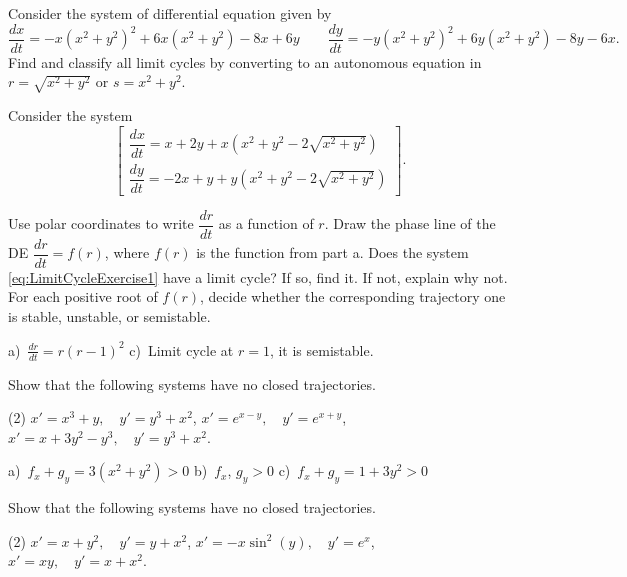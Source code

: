 \begin{exercise}\ansMark%
Consider the system of differential equation given by
\[ \frac{dx}{dt} = -x(x^2 + y^2)^2 + 6x(x^2 + y^2) - 8x + 6y \qquad \frac{dy}{dt} = -y(x^2 + y^2)^2 + 6y(x^2 + y^2) - 8y - 6x .\]
Find and classify all limit cycles by converting to an autonomous equation in $r = \sqrt{x^2 + y^2}$ or $s = x^2 + y^2$. 
\end{exercise}

\begin{exercise}
Consider the system %
\begin{equation}
\begin{bmatrix}\dfrac{dx}{dt}=x+2y+x(x^2+y^2-2\sqrt{x^2+y^2})\\[6pt]
  \dfrac{dy}{dt}=-2x+y+y(x^2+y^2-2\sqrt{x^2+y^2})
\end{bmatrix}. \label{eq:LimitCycleExercise1}
\end{equation}
\begin{tasks}
\task Use polar coordinates to write $\dfrac{dr}{dt}$ as a function of $r$.
\task Draw the phase line of the DE $\dfrac{dr}{dt}=f(r)$, where $f(r)$ is the function from part a.
\task Does the system \eqref{eq:LimitCycleExercise1} have a limit cycle? If so, find it. If not, explain why not.
For each positive root of $f(r)$, decide whether the corresponding trajectory one is stable, unstable, or semistable.
\end{tasks}
\end{exercise}
\comboSol{%
}
{%
a)~$\frac{dr}{dt} = r(r-1)^2$ \quad c)~Limit cycle at $r=1$, it is semistable.
}

\begin{exercise}
Show that the following systems have no closed trajectories.
\begin{tasks}(2)
\task $x'=x^3+y,\quad y'=y^3+x^2$,
\task $x'=e^{x-y},\quad y'=e^{x+y}$,
\task $x'=x+3y^2-y^3,\quad y'=y^3+x^2$.
\end{tasks}
\end{exercise}
\comboSol{%
}
{%
a)~$f_x + g_y = 3(x^2 + y^2) > 0$ \quad b)~$f_x$, $g_y > 0$ \quad c)~$f_x + g_y = 1+3y^2 > 0$
}

\begin{exercise}\ansMark%
Show that the following systems have no closed trajectories.
\begin{tasks}(2)
\task $x'=x+y^2,\quad y'=y+x^2$,
\task $x'=-x\sin^2(y),\quad y'=e^x$,
\task $x'=xy,\quad y'=x+x^2$.
\end{tasks}
\end{exercise}

